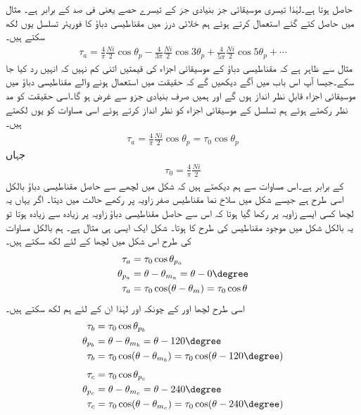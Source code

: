حاصل ہوتا ہے۔لہٰذا تیسری موسیقائی جز بنیادی جز کے تیسرے حصے یعنی  فی صد کے برابر ہے۔
%
مثال  میں حاصل کئے گئے  استعمال کرتے ہوئے  ہم خلائی درز میں مقناطیسی دباؤ  کا فوریئر تسلسل یوں لکھ سکتے ہیں۔
\begin{align}\label{مساوات_تبادلہ_توانائی_فوریئر_متقناطیسی_دباؤ_تسلسل}
\tau_a=\frac{4}{\pi}\frac{Ni}{2} \cos \theta_p-\frac{4}{3\pi}\frac{Ni}{2} \cos 3\theta_p+\frac{4}{5\pi}\frac{Ni}{2} \cos 5\theta_p+\cdots
\end{align}
مثال  سے ظاہر ہے کہ مقناطیسی دباؤ کے موسیقائی اجزاء  کی قیمتیں اتنی کم نہیں کہ انہیں رد کیا جا سکے۔جیسا آپ اس باب میں آگے دیکھیں گے کہ حقیقت میں استعمال ہونے والے  مقناطیسی دباؤ میں موسیقائی اجزاء قابلِ نظر انداز ہوں گے اور ہمیں صرف بنیادی جزو  سے غرض ہو گا۔اسی حقیقت کو مد نظر رکھتے ہوئے ہم  تسلسل کے موسیقائی اجزاء کو نظر انداز کرتے ہوئے اسی مساوات کو یوں لکھتے ہیں۔ 
\begin{align}
\tau_{a}=\frac{4}{\pi}\frac{Ni}{2} \cos \theta_p=\tau_0 \cos \theta_p
\end{align}
جہاں
\begin{align}
\tau_0=\frac{4}{\pi}\frac{Ni}{2} 
\end{align}
کے برابر ہے۔اس مساوات سے ہم دیکھتے ہیں کہ شکل  میں لچھے سے حاصل مقناطیسی دباؤ بالکل اسی طرح ہے جیسے شکل  میں سلاخ نما مقناطیس صفر زاویہ پر رکھے حالت میں دیتا۔ اگر یہاں یہ لچھا کسی ایسے زاویہ پر رکھا گیا ہوتا کہ اس سے حاصل مقناطیسی دباؤ زاویہ   پر زیادہ سے زیادہ ہوتا تو یہ بالکل شکل  میں موجود مقناطیس کی طرح کا ہوتا۔ شکل  ایک ایسی ہی مثال ہے۔ ہم بالکل مساوات   کی طرح اس شکل میں لچھا   کے لئے لکھ سکتے ہیں۔
\begin{gather}
\begin{aligned}
\tau_a&=\tau_0 \cos \theta_{p_a}\\
\theta_{p_a}&=\theta-\theta_{m_a}=\theta-0\degree\\
\tau_a&=\tau_0 \cos (\theta-\theta_m)=\tau_0 \cos \theta
\end{aligned}
\end{gather}
اسی طرح لچھا  اور  کے  چونکہ  اور   لہٰذا ان کے لئے ہم لکھ سکتے ہیں۔
\begin{gather}
\begin{aligned}
\tau_b&=\tau_0 \cos \theta_{p_b}\\
\theta_{p_b}&=\theta-\theta_{m_b}=\theta-120\degree\\
\tau_b&=\tau_0 \cos (\theta-\theta_{m_b})=\tau_0 \cos (\theta-120\degree)
\end{aligned}
\end{gather}
%
\begin{gather}
\begin{aligned}
\tau_c&=\tau_0 \cos \theta_{p_c}\\
\theta_{p_c}&=\theta-\theta_{m_c}=\theta-240\degree\\
\tau_c&=\tau_0 \cos (\theta-\theta_{m_c})=\tau_0 \cos (\theta-240\degree)
\end{aligned}
\end{gather}

